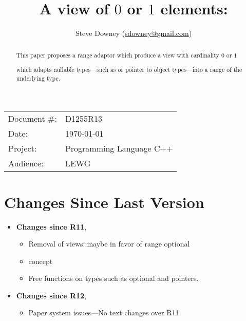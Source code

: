 \documentclass[a4paper,10pt,oneside,openany,final,article]{memoir}
\begin{document}
\title{A view of $0$ or $1$ elements: }
\author{
Steve Downey \small(\href{mailto:sdowney@gmail.com}{sdowney@gmail.com}) \\
}
\date{} %
\maketitle

\begin{flushright}
\begin{tabular}{ll}
  Document \#: & D1255R13 \\
  Date: & \today \\
  Project: & Programming Language C++ \\
  Audience: & LEWG
\end{tabular}
\end{flushright}

\begin{abstract}
  This paper proposes a range adaptor which produce a view with cardinality $0$ or $1$

   which adapts nullable types---such as  or pointer to object types---into a range of the underlying type.
\end{abstract}

\tableofcontents*

\chapter*{Changes Since Last Version}

\begin{itemize}
\item \textbf{Changes since R11},
  \begin{itemize}
  \item Removal of views::maybe in favor of range optional
  \item {} concept
  \item Free functions on  types such as optional and pointers.
  \end{itemize}
\item \textbf{Changes since R12},
  \begin{itemize}
  \item Paper system issues---No text changes over R11
  \end{itemize}
\end{itemize}
\end{document}

